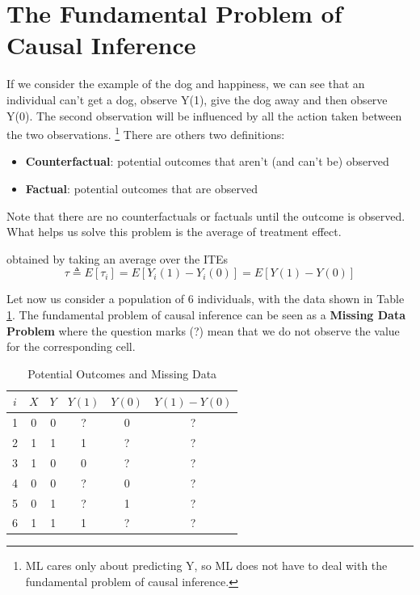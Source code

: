 \section{The Fundamental Problem of Causal Inference}
If we consider the example of the dog and happiness, we can see that an individual can't get a dog,
observe Y(1), give the dog away and then observe Y(0). The second observation will be influenced by
all the action taken between the two observations.
\footnote{ML cares only about predicting Y, so ML does not have to deal with the fundamental problem of causal inference.}
There are others two definitions:
\begin{itemize}
    \item \textbf{Counterfactual}: potential outcomes that aren't (and can't be) observed
    \item \textbf{Factual}: potential outcomes that are observed
\end{itemize}
Note that there are no counterfactuals or factuals until the outcome is observed.
\newline
What helps us solve this problem is the average of treatment effect.
\begin{definition}
    obtained by taking an average over the ITEs
    \begin{equation}
        \tau \triangleq E[\tau_i] = E[Y_i(1) - Y_i(0)] = E[Y(1) - Y(0)]
        \label{eq:ate_init}
    \end{equation}
\end{definition}
\noindent
Let now us consider a population of 6 individuals, with the data shown in Table \ref{tab:potential_outcomes}. 
The fundamental problem of causal inference can be seen as a \textbf{Missing Data Problem} where the question
marks (?) mean that we do not observe the value for the corresponding cell.
\begin{table}[htbp]
    \centering
    \begin{tabular}{cccccc}
        \toprule
        $i$ & $X$ & $Y$ & $Y(1)$ & $Y(0)$ & $Y(1) - Y(0)$ \\
        \midrule
        1 & 0 & 0 & ? & 0 & ? \\
        2 & 1 & 1 & 1 & ? & ? \\
        3 & 1 & 0 & 0 & ? & ? \\
        4 & 0 & 0 & ? & 0 & ? \\
        5 & 0 & 1 & ? & 1 & ? \\
        6 & 1 & 1 & 1 & ? & ? \\
        \bottomrule
    \end{tabular}
    \caption{Potential Outcomes and Missing Data}
    \label{tab:potential_outcomes}
\end{table}
